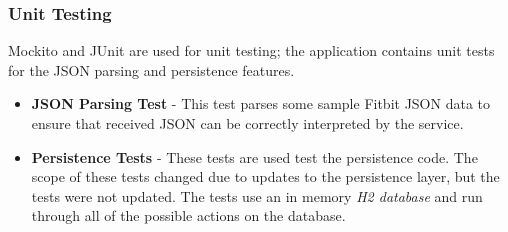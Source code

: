 \subsubsection{Unit Testing}

Mockito and JUnit are used for unit testing; the application contains unit tests for the JSON parsing and persistence features.

\begin{itemize}
	\item \textbf{JSON Parsing Test} - This test parses some sample Fitbit JSON data to ensure that received JSON can be correctly interpreted by the service.

	\item \textbf{Persistence Tests} - These tests are used test the persistence code. The scope of these tests changed due to updates to the persistence layer, but the tests were not updated. The tests use an in memory \textit{H2 database}\cite{H2} and run through all of the possible actions on the database.
\end{itemize}
